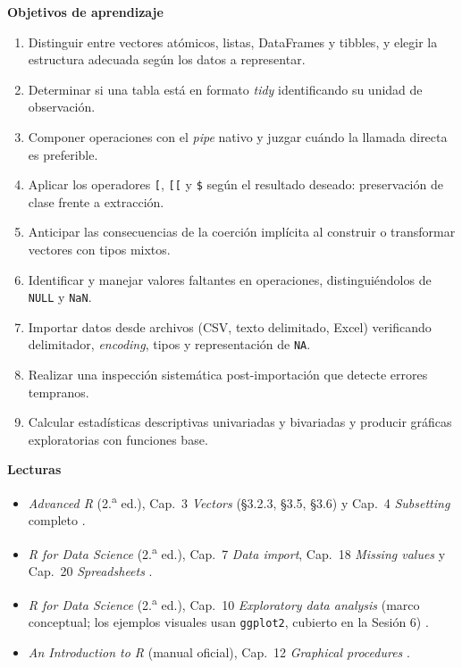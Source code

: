 \documentclass[11pt,letterpaper]{article}
\begin{document}
\medskip
\noindent\textbf{Objetivos de aprendizaje}
\begin{enumerate}[leftmargin=*, itemsep=1pt]
    \item Distinguir entre vectores atómicos, listas, DataFrames y tibbles, y elegir la estructura adecuada según los datos a representar.
    \item Determinar si una tabla está en formato \textit{tidy} identificando su unidad de observación.
    \item Componer operaciones con el \textit{pipe} nativo y juzgar cuándo la llamada directa es preferible.
    \item Aplicar los operadores \texttt{[}, \texttt{[[} y \texttt{\$} según el resultado deseado: preservación de clase frente a extracción.
    \item Anticipar las consecuencias de la coerción implícita al construir o transformar vectores con tipos mixtos.
    \item Identificar y manejar valores faltantes en operaciones, distinguiéndolos de \texttt{NULL} y \texttt{NaN}.
    \item Importar datos desde archivos (CSV, texto delimitado, Excel) verificando delimitador, \textit{encoding}, tipos y representación de \texttt{NA}.
    \item Realizar una inspección sistemática post-importación que detecte errores tempranos.
    \item Calcular estadísticas descriptivas univariadas y bivariadas y producir gráficas exploratorias con funciones base.
\end{enumerate}

\medskip
\noindent\textbf{Lecturas}
\begin{itemize}[leftmargin=*, itemsep=1pt]
    \item \textit{Advanced R} (2.\textsuperscript{a} ed.), Cap.\ 3 \textit{Vectors} (§3.2.3, §3.5, §3.6) y Cap.\ 4 \textit{Subsetting} completo \cite{wickham2019advr}.
    \item \textit{R for Data Science} (2.\textsuperscript{a} ed.), Cap.\ 7 \textit{Data import}, Cap.\ 18 \textit{Missing values} y Cap.\ 20 \textit{Spreadsheets} \cite{wickham2023r4ds}.
    \item \textit{R for Data Science} (2.\textsuperscript{a} ed.), Cap.\ 10 \textit{Exploratory data analysis} (marco conceptual; los ejemplos visuales usan \texttt{ggplot2}, cubierto en la Sesión 6) \cite{wickham2023r4ds}.
    \item \textit{An Introduction to R} (manual oficial), Cap.\ 12 \textit{Graphical procedures} \cite{rcoreteam-intro}.
\end{itemize}
\end{document}
